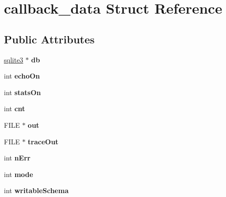 \hypertarget{structcallback__data}{\section{callback\-\_\-data Struct Reference}
\label{structcallback__data}
}
\subsection*{Public Attributes}
\begin{DoxyCompactItemize}
\item 
\hypertarget{structcallback__data_abedf4296c2975d319fa40799a23f54de}{\hyperlink{structsqlite3}{sqlite3} $\ast$ {\bfseries db}}\label{structcallback__data_abedf4296c2975d319fa40799a23f54de}

\item 
\hypertarget{structcallback__data_a45c9183aaa07be9e2086d3ec6013c236}{int {\bfseries echo\-On}}\label{structcallback__data_a45c9183aaa07be9e2086d3ec6013c236}

\item 
\hypertarget{structcallback__data_ae3b40039c97de4fd46ae314b370dfc0c}{int {\bfseries stats\-On}}\label{structcallback__data_ae3b40039c97de4fd46ae314b370dfc0c}

\item 
\hypertarget{structcallback__data_a6e9b9db4da2d13ff827e91025ff7ff8e}{int {\bfseries cnt}}\label{structcallback__data_a6e9b9db4da2d13ff827e91025ff7ff8e}

\item 
\hypertarget{structcallback__data_af74435f6fa42509b6e2bf84d66baed72}{F\-I\-L\-E $\ast$ {\bfseries out}}\label{structcallback__data_af74435f6fa42509b6e2bf84d66baed72}

\item 
\hypertarget{structcallback__data_a05bf015336afef865c645653c8da5b37}{F\-I\-L\-E $\ast$ {\bfseries trace\-Out}}\label{structcallback__data_a05bf015336afef865c645653c8da5b37}

\item 
\hypertarget{structcallback__data_ac484e3009e75d7857e39f0c97bc0227f}{int {\bfseries n\-Err}}\label{structcallback__data_ac484e3009e75d7857e39f0c97bc0227f}

\item 
\hypertarget{structcallback__data_afb33755794b0fdb993069f78c2f7cbd8}{int {\bfseries mode}}\label{structcallback__data_afb33755794b0fdb993069f78c2f7cbd8}

\item 
\hypertarget{structcallback__data_adff77d840653bf454fe34bbb483f53bc}{int {\bfseries writable\-Schema}}\label{structcallback__data_adff77d840653bf454fe34bbb483f53bc}


\end{DoxyCompactItemize}
